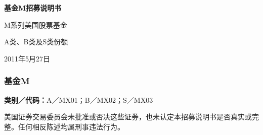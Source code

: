 \documentclass[UTF8,fontset=none,11pt,a4paper]{ctexart}
\begin{document}
{\noindent\fontsize{20}{25}\selectfont\bfseries 基金M招募说明书\par}
\vspace{10pt}
M系列美国股票基金

A类、B类及S类份额

2011年5月27日

\subsubsection*{基金M}
\textbf{类别／代码：}A／MX01；B／MX02；S／MX03

美国证券交易委员会未批准或否决这些证券，也未认定本招募说明书是否真实或完整。任何相反陈述均属刑事违法行为。
\end{document}

